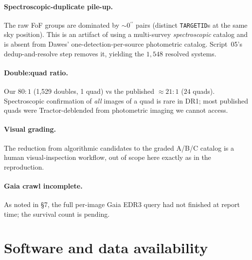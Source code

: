 \documentclass[11pt,letterpaper]{article}
\newcommand{\asec}{\ensuremath{^{\prime\prime}}}
\begin{document}
\paragraph{Spectroscopic-duplicate pile-up.} The raw FoF groups are
dominated by ${\sim}0\asec$ pairs (distinct \texttt{TARGETID}s at the same
sky position). This is an artifact of using a multi-survey
\emph{spectroscopic} catalog and is absent from Dawes' one-detection-per-source
photometric catalog. Script~05's dedup-and-resolve step removes it, yielding
the $1{,}548$ resolved systems.

\paragraph{Double:quad ratio.} Our $80{:}1$ (1{,}529 doubles, 1 quad) vs
the published ${\approx}21{:}1$ ($24$ quads). Spectroscopic confirmation of
\emph{all} images of a quad is rare in DR1; most published quads were
Tractor-deblended from photometric imaging we cannot access.

\paragraph{Visual grading.} The reduction from algorithmic candidates to
the graded A/B/C catalog is a human visual-inspection workflow, out of
scope here exactly as in the \citet{hsu2025pairwise} reproduction.

\paragraph{Gaia crawl incomplete.} As noted in \S7, the full per-image Gaia
EDR3 query had not finished at report time; the survival count is pending.

\section{Software and data availability}
\end{document}
